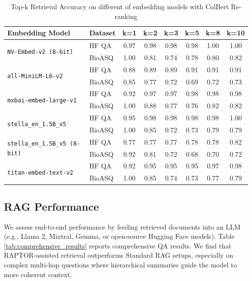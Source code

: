 \documentclass{scrartcl}
\begin{document}
\begin{table}[H]
\centering
\small
\begin{tabular}{l l c c c c c c}
\hline
\textbf{Embedding Model} & \textbf{Dataset} & \textbf{k=1} & \textbf{k=2} & \textbf{k=3} & \textbf{k=5} & \textbf{k=8} & \textbf{k=10} \\
\hline
\multirow{2}{*}{\texttt{NV-Embed-v2 (8-bit)}}
 & HF QA  & 0.97 & 0.98 & 0.98 & 0.98 & 1.00 & 1.00 \\
 & BioASQ & 1.00 & 0.81 & 0.74 & 0.78 & 0.80 & 0.82 \\
\hline
\multirow{2}{*}{\texttt{all-MiniLM-L6-v2}}
 & HF QA  & 0.88 & 0.89 & 0.89 & 0.91 & 0.91 & 0.91 \\
 & BioASQ & 0.85 & 0.77 & 0.72 & 0.69 & 0.72 & 0.73 \\
\hline
\multirow{2}{*}{\texttt{mxbai-embed-large-v1}}
 & HF QA  & 0.92 & 0.97 & 0.97 & 0.98 & 0.98 & 0.98 \\
 & BioASQ & 1.00 & 0.88 & 0.77 & 0.76 & 0.82 & 0.82 \\
\hline

\multirow{2}{*}{\texttt{stella\_en\_1.5B\_v5}}
 & HF QA  & 0.95 & 0.98 & 0.98 & 0.98 & 0.98 & 1.00 \\
 & BioASQ & 1.00 & 0.85 & 0.72 & 0.73 & 0.79 & 0.79 \\
\hline
\multirow{2}{*}{\texttt{stella\_en\_1.5B\_v5 (8-bit)}}
 & HF QA  & 0.77 & 0.77 & 0.77 & 0.78 & 0.78 & 0.82 \\
 & BioASQ & 0.92 & 0.81 & 0.72 & 0.68 & 0.70 & 0.72 \\
\hline
\multirow{2}{*}{\texttt{titan-embed-text-v2}} 
 & HF QA & 0.92 & 0.95 & 0.95 & 0.95 & 0.97 & 0.98 \\
 & BioASQ & 1.00 & 0.85 & 0.74 & 0.73 & 0.77 & 0.79 \\
\hline
\end{tabular}
\caption{Top-k Retrieval Accuracy on different of embedding models with ColBert Re-ranking}
\end{table}


\subsection{RAG Performance}

We assess end-to-end performance by feeding retrieved documents into an LLM (e.g., Llama 2, Mixtral, Gemma, or open-source Hugging Face models). Table \ref{tab:comprehensive_results} reports comprehensive QA results. We find that RAPTOR-assisted retrieval outperforms Standard RAG setups, especially on complex multi-hop questions where hierarchical summaries guide the model to more coherent context.
\end{document}

